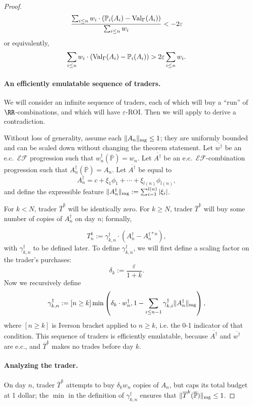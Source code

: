 \documentclass[authordate,onecolumn,noenvironments]{miri-tech-article}
\numberwithin{equation}{subsection}
\newcommand{\seq}[1]{{\overline{#1}}}
\newcommand{\nn}{n}
\newcommand{\fuz}{w}
\newcommand{\ec}[1][\ ]{e.c.#1}
\newcommand{\exfeatures}{\mathcal{E\!F}} %
\newcommand{\aff}{A}
\newcommand{\trade}{T}%
\newcommand{\Trader}{\seq{\trade}} %
\newcommand{\gens}{\dagger}
\newcommand{\gen}[1]{{#1^\gens}}
\newcommand{\magnit}[1]{{\|#1\|_{\rm mg}}} %
\newcommand{\BelState}{\mathbb{P}}
\newcommand{\pt}{\BelState}
\newcommand{\MP}{\seq{\pt}}
\newcommand{\ftn}{(\MP)} %
\newcommand{\Theory}{\Gamma}
\newcommand{\thmval}[1][\Theory]{\operatorname{Val}_{#1}\-} %
\begin{document}
\begin{proof}
      \[ 
      \frac
      {\sum_{i\leq \nn}\fuz_i\cdot (\pt_i(\aff_i) - \thmval(\aff_i))}
        {\sum_{i\leq \nn}\fuz_i}
        <- 2\varepsilon
      \]
        or equivalently,
        \[ 
        \sum_{i\leq \nn}\fuz_i\cdot (\thmval(\aff_i) - \pt_i(\aff_i))
        > 2\varepsilon\sum_{i \leq \nn} \fuz_i .
      \]

      \paragraph{An efficiently emulatable sequence of traders.}
      We will consider an infinite sequence of traders, each of which will buy a ``run'' of $\RR$-combinations, and which will have $\varepsilon$-ROI\@.  Then we will apply  to derive a contradiction.

      Without loss of generality, assume each $\magnit{\aff_n} \leq 1$; they are uniformly bounded and can be scaled down without changing the theorem statement.
      Let $\seq{\gen \fuz}$ be an \ec $\exfeatures$ progression such that $\gen{\fuz_n} \ftn = \fuz_n$.  Let $\seq{\gen \aff}$ be an \ec $\exfeatures$-combination progression such that $\gen{\aff_n} \ftn = \aff_n$.  Let $\seq{\gen\aff}$ be equal to
      \[
        \gen{\aff_n} = c + \xi_1 \phi_1 + \cdots + \xi_{l(n)} \phi_{l(n)},
      \]
      and define the expressible feature $\magnit{\gen{\aff_n}} := \sum_{i=1}^{l(n)} |\xi_i|$.

      For $k < N$, trader $\Trader^k$ will be identically zero.  For $k \geq N$, trader $\Trader^k$ will buy some number of copies of $\gen{\aff_n}$ on day $n$; formally,

      \[ \trade^k_n := \gen{\gamma_{k,n}} \cdot (\gen{\aff_n} - \aff_n^{\gens * n}) , \]
      with $\gen{\gamma_{k,n}}$ to be defined later.  To define $\gen{\gamma_{k,n}}$, we will first define a scaling factor on the trader's purchases:
      \[ \delta_k := \frac{\varepsilon}{1 + k} . \]
      Now we recursively define
      \[
        \gen{\gamma_{k, \nn}} := [\nn \geq k] \min\left(\delta_k \cdot \gen{\fuz_\nn}, 1 - \sum_{i\le \nn-1} \gen{\gamma_{k, i}} \magnit{ \gen{\aff_n} } \right),
      \]
      where $[\nn \geq k] $ is Iverson bracket applied to $n \geq k$, i.e. the 0-1 indicator of that condition.
      This sequence of traders is efficiently emulatable, because $\seq{\gen\aff}$ and $\seq{\gen\fuz}$ are \ec[], and $\Trader^k$ makes no trades before day $k$.

      \paragraph{Analyzing the trader.}
      On day $n$, trader $\Trader^k$ attempts to buy $\delta_k \fuz_n$ copies of $\aff_n$, but caps
      its total budget at 1 dollar; the $\min$ in the definition of $\gen{\gamma_{k, n}}$ ensures that $\magnit{\Trader^k \ftn } \leq 1$.


\end{proof}
\end{document}
